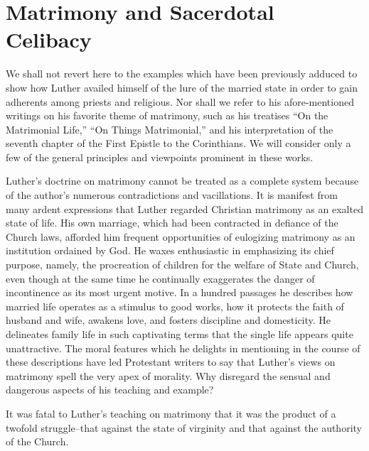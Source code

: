 \section{Matrimony and Sacerdotal Celibacy}

We shall not revert here to the examples which have been previously adduced
to show how Luther availed himself of the lure of
the married state in order to gain adherents among priests and religious.
Nor shall we refer to his afore-mentioned writings on his
favorite theme of matrimony, such as his treatises “On the Matrimonial
Life,” “On Things Matrimonial,” and his interpretation of
the seventh chapter of the First Epistle to the Corinthians. We will
consider only a few of the general principles and viewpoints prominent in these works.

Luther’s doctrine on matrimony cannot be treated as a complete
system because of the author’s numerous contradictions and vacillations.
It is manifest from many ardent expressions that Luther regarded Christian
matrimony as an exalted state of life. His own marriage,
which had been contracted in defiance of the Church laws,
afforded him frequent opportunities of eulogizing matrimony as an
institution ordained by God. He waxes enthusiastic in emphasizing its
chief purpose, namely, the procreation of children for the welfare of
State and Church, even though at the same time he continually exaggerates
the danger of incontinence as its most urgent motive. In a
hundred passages he describes how married life operates as a stimulus
to good works, how it protects the faith of husband and wife, awakens love,
and fosters discipline and domesticity. He delineates family
life in such captivating terms that the single life appears quite unattractive.
The moral features which he delights in mentioning in
the course of these descriptions have led Protestant writers to say
that Luther’s views on matrimony spell the very apex of morality.
Why disregard the sensual and dangerous aspects of his teaching and
example?

It was fatal to Luther’s teaching on matrimony that it was the
product of a twofold struggle--that against the state of virginity
and that against the authority of the Church.

